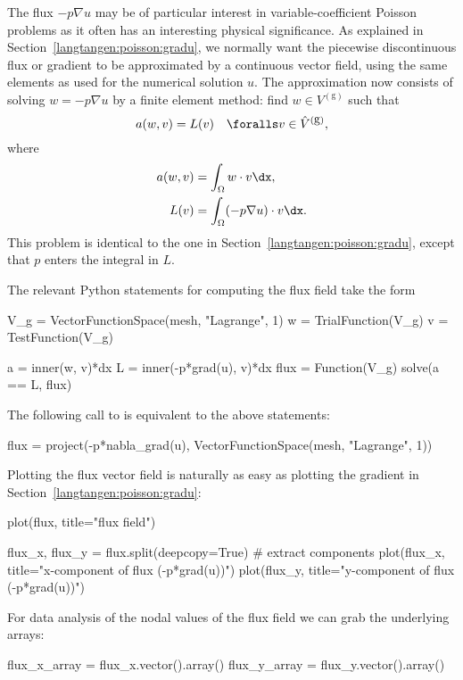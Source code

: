 The flux $-p\nabla u$ may be of particular interest in
variable-coefficient Poisson problems as it often has an interesting
physical significance. As explained in
Section~\ref{langtangen:poisson:gradu}, we normally want the piecewise
discontinuous flux or gradient to be approximated by a continuous
vector field, using the same elements as used for the numerical
solution $u$. The approximation now consists of solving $w = -p\nabla
u$ by a finite element method: find $w\in V^{(\mbox{g})}$ such that
\begin{equation}
a(w, v) = L(v)\quad\foralls v\in \hat{V}^{(\mbox{g})},
\end{equation}
where
\begin{align}
a(w, v) &= \int_\Omega w\cdot v\dx,
\\
L(v) &= \int_\Omega (-p \nabla u)\cdot v\dx.
\end{align}
This problem is identical to the one in Section~\ref{langtangen:poisson:gradu},
except that $p$ enters the integral in $L$.

The relevant Python statements for computing the flux field take the form
\begin{python}
V_g = VectorFunctionSpace(mesh, "Lagrange", 1)
w = TrialFunction(V_g)
v = TestFunction(V_g)

a = inner(w, v)*dx
L = inner(-p*grad(u), v)*dx
flux = Function(V_g)
solve(a == L, flux)
\end{python}
The following call to  is equivalent to the above statements:
\begin{python}
flux = project(-p*nabla_grad(u),
               VectorFunctionSpace(mesh, "Lagrange", 1))
\end{python}

Plotting the flux vector field is naturally as easy as plotting
the gradient in Section~\ref{langtangen:poisson:gradu}:
\begin{python}
plot(flux, title="flux field")

flux_x, flux_y = flux.split(deepcopy=True)  # extract components
plot(flux_x, title="x-component of flux (-p*grad(u))")
plot(flux_y, title="y-component of flux (-p*grad(u))")
\end{python}

For data analysis of the nodal values of the flux field we can
grab the underlying  arrays:
\begin{python}
flux_x_array = flux_x.vector().array()
flux_y_array = flux_y.vector().array()
\end{python}

